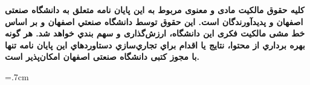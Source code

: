 \thispagestyle{empty}

\begin{spacing}{3}
	\leavevmode
	\vfill
	\parbox{8 cm}{
		
		\textbf{\Large کلیه حقوق مالکیت مادی و معنوی مربوط به اين پايان نامه متعلق به دانشگاه صنعتی اصفهان و پدیدآورندگان است. این حقوق توسط دانشگاه صنعتي اصفهان و بر اساس خط مشی مالکیت فکری این دانشگاه، ارزش‌گذاری و سهم بندي خواهد شد.
			هر گونه بهره برداري از محتوا، نتايج یا اقدام براي تجاري‌سازي دستاوردهاي اين پايان نامه تنها با مجوز کتبی دانشگاه صنعتی اصفهان امکان‌پذیر است.
			}
		
	}
	\vfill
\end{spacing}
\restoregeometry
\pagebreak


	


\baselineskip=.7cm

\tableofcontents
\pagebreak


\renewcommand\listfigurename{فهرست شکل‌ها}
\listoffigures
\pagebreak

\renewcommand\listtablename{فهرست جداول}
\listoftables
\pagebreak

\titlespacing*{\chapter}{0pt}{3.5cm}{6cm}

